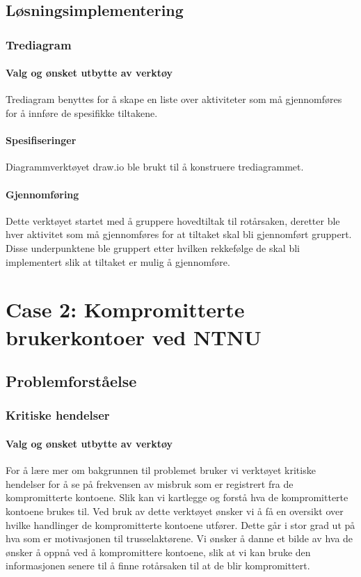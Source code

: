 \subsection{Løsningsimplementering}

\subsubsection{Trediagram}

\paragraph{Valg og ønsket utbytte av verktøy}
Trediagram benyttes for å skape en liste over aktiviteter som må gjennomføres for å innføre de spesifikke tiltakene. 

\paragraph{Spesifiseringer}
Diagrammverktøyet draw.io ble brukt til å konstruere trediagrammet. 

\paragraph{Gjennomføring}
Dette verktøyet startet med å gruppere hovedtiltak til rotårsaken, deretter ble hver aktivitet som må gjennomføres for at tiltaket skal bli gjennomført gruppert. Disse underpunktene ble gruppert etter hvilken rekkefølge de skal bli implementert slik at tiltaket er mulig å gjennomføre. 


\newpage
\section{Case 2: Kompromitterte brukerkontoer ved NTNU}

\subsection{Problemforståelse}

\subsubsection{Kritiske hendelser}

\paragraph{Valg og ønsket utbytte av verktøy}
For å lære mer om bakgrunnen til problemet bruker vi verktøyet kritiske hendelser for å se på frekvensen av misbruk som er registrert fra de kompromitterte kontoene. Slik kan vi kartlegge og forstå hva de kompromitterte kontoene brukes til. Ved bruk av dette verktøyet ønsker vi å få en oversikt over hvilke handlinger de kompromitterte kontoene utfører. Dette går i stor grad ut på hva som er motivasjonen til trusselaktørene. Vi ønsker å danne et bilde av hva de ønsker å oppnå ved å kompromittere kontoene, slik at vi kan bruke den informasjonen senere til å finne rotårsaken til at de blir kompromittert. 

